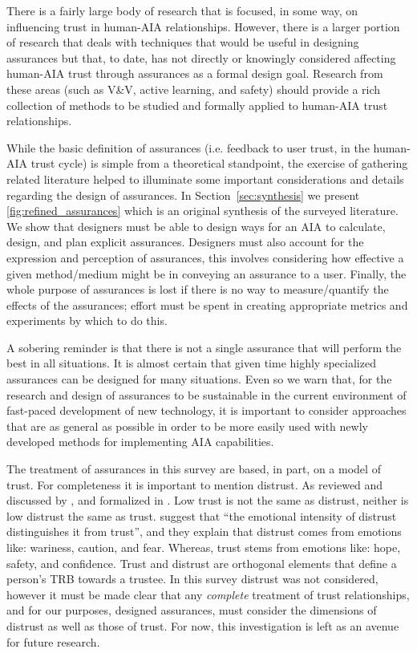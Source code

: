     There is a fairly large body of research that is focused, in some way, on influencing trust in human-AIA relationships. However, there is a larger portion of research that deals with techniques that would be useful in designing assurances but that, to date, has not directly or knowingly considered affecting human-AIA trust through assurances as a formal design goal. Research from these areas (such as V\&V, active learning, and safety) should provide a rich collection of methods to be studied and formally applied to human-AIA trust relationships.

    While the basic definition of assurances (i.e. feedback to user trust, in the human-AIA trust cycle) is simple from a theoretical standpoint, the exercise of gathering related literature helped to illuminate some important considerations and details regarding the design of assurances. In Section~\ref{sec:synthesis} we present \ref{fig:refined_assurances} which is an original synthesis of the surveyed literature. We show that designers must be able to design ways for an AIA to calculate, design, and plan explicit assurances. Designers must also account for the expression and perception of assurances, this involves considering how effective a given method/medium might be in conveying an assurance to a user. Finally, the whole purpose of assurances is lost if there is no way to measure/quantify the effects of the assurances; effort must be spent in creating appropriate metrics and experiments by which to do this.

    A sobering reminder is that there is not a single assurance that will perform the best in all situations. It is almost certain that given time highly specialized assurances can be designed for many situations. Even so we warn that, for the research and design of assurances to be sustainable in the current environment of fast-paced development of new technology, it is important to consider approaches that are as general as possible in order to be more easily used with newly developed methods for implementing AIA capabilities.

    The treatment of assurances in this survey are based, in part, on a model of trust. For completeness it is important to mention distrust. As reviewed and discussed by \citet{Lewicki1998-ox}, and formalized in \cite{McKnight2001-hm,McKnight2001-gz}. Low trust is not the same as distrust, neither is low distrust the same as trust. \citet{McKnight2001-gz} suggest that ``the emotional intensity of distrust distinguishes it from trust'', and they explain that distrust comes from emotions like: wariness, caution, and fear. Whereas, trust stems from emotions like: hope, safety, and confidence. Trust and distrust are orthogonal elements that define a person's TRB towards a trustee. In this survey distrust was not considered, however it must be made clear that any \emph{complete} treatment of trust relationships, and for our purposes, designed assurances, must consider the dimensions of distrust as well as those of trust. For now, this investigation is left as an avenue for future research.

